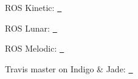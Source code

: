 \begin{DoxyItemize}
\item R\+OS Kinetic\+: \href{http://build.ros.org/job/Kdev__mavros__ubuntu_xenial_amd64/}{\texttt{ }}
\item R\+OS Lunar\+: \href{http://build.ros.org/job/Ldev__mavros__ubuntu_xenial_amd64/}{\texttt{ }}
\item R\+OS Melodic\+: \href{http://build.ros.org/job/Mdev__mavros__ubuntu_bionic_amd64/}{\texttt{ }}
\item Travis master on Indigo \& Jade\+: \href{https://travis-ci.org/mavlink/mavros}{\texttt{ }} 
\end{DoxyItemize}